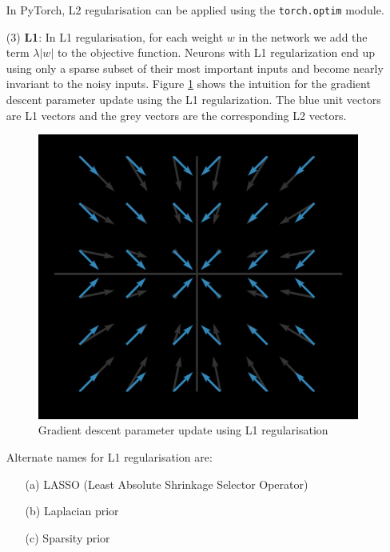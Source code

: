 \begin{itemize}
    In PyTorch, L2 regularisation can be applied using the \texttt{torch.optim} module.
    
    \item[(3)] \textbf{L1}: In L1 regularisation, for each weight $w$ in the network we add the term $\lambda |w|$ to the objective function.
    Neurons with L1 regularization end up using only a sparse subset of their most important inputs and become nearly invariant to the noisy inputs.
    Figure \ref{fig:L1} shows the intuition for the gradient descent parameter update using the L1 regularization. The blue unit vectors are L1 vectors and the grey vectors are the corresponding L2 vectors.
    
    \begin{figure}
        \centering
        \includegraphics[scale=0.5]{labs/08/images/L1}
        \caption{Gradient descent parameter update using L1 regularisation}
        \label{fig:L1}
    \end{figure}
        
    Alternate names for L1 regularisation are:
    \begin{itemize}
        \item[(a)] LASSO (Least Absolute Shrinkage Selector Operator)
        \item[(b)] Laplacian prior
        \item[(c)] Sparsity prior
    \end{itemize}
        

\end{itemize}
